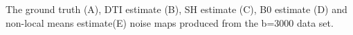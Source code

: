 \label{fig:axEstimate} The ground truth (A), DTI estimate (B), SH estimate (C), B0 estimate (D) and non-local means estimate(E) noise maps produced from the b=3000 data set.